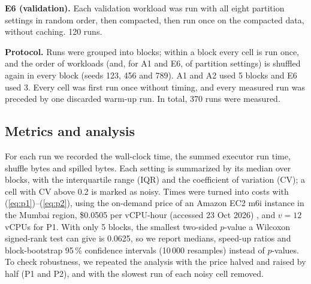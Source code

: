 \textbf{E6 (validation).} Each validation workload was run with all eight partition settings
in random order, then compacted, then run once on the compacted data, without caching.
120 runs.

\textbf{Protocol.} Runs were grouped into blocks; within a block every cell is run once, and
the order of workloads (and, for A1 and E6, of partition settings) is shuffled again in every
block (seeds 123, 456 and 789). A1 and A2 used 5 blocks and E6 used 3. Every cell was first run
once without timing, and every measured run was preceded by one discarded warm-up run. In
total, 370 runs were measured.

\subsection{Metrics and analysis}
For each run we recorded the wall-clock time, the summed executor run time, shuffle bytes and
spilled bytes. Each setting is summarized by its median over blocks, with the interquartile
range (IQR) and the coefficient of variation (CV); a cell with CV above 0.2 is marked as noisy.
Times were turned into costs with (\ref{eq:p1})--(\ref{eq:p2}), using the on-demand price of
an Amazon EC2 m6i instance in the Mumbai region, \$0.0505 per vCPU-hour (accessed 23 Oct 2026)
\cite{aws2026ec2pricing}, and $v = 12$ vCPUs for P1. With only 5 blocks, the smallest
two-sided $p$-value a Wilcoxon signed-rank test can give is 0.0625, so we report medians,
speed-up ratios and block-bootstrap 95\,\% confidence intervals (10\,000
resamples) instead of $p$-values. To check robustness, we repeated the analysis with the price
halved and raised by half (P1 and P2), and with the slowest run of each noisy cell removed.
